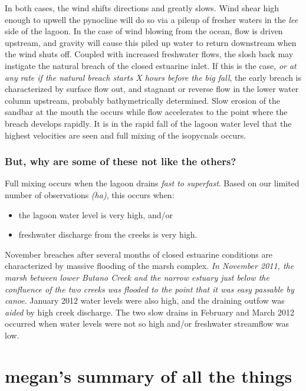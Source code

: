 In both cases, the wind shifts directions and greatly slows. Wind shear high enough to upwell the pynocline will do so via a pileup of fresher waters in the \emph{lee} side of the lagoon. In the case of wind blowing from the ocean, flow is driven upstream, and gravity will cause this piled up water to return downstream when the wind shuts off. Coupled with increased freshwater flows, the slosh back may instigate the natural breach of the closed estuarine inlet. 
If this is the case, \emph{or at any rate if the natural breach starts X hours before the big fall}, the early breach is characterized by surface flow out, and stagnant or reverse flow in the lower water column upstream, probably bathymetrically determined. Slow erosion of the sandbar at the mouth the occurs while flow accelerates to the point where the breach develops rapidly. It is in the rapid fall of the lagoon water level that the highest velocities are seen and full mixing of the isopycnals occurs. 

\subsubsection{But, why are some of these not like the others?}

Full mixing occurs when the lagoon drains \emph{fast to superfast}. Based on our limited number of observations \emph{(ha)}, this occurs when:
\begin{itemize}
	\item the lagoon water level is very high, and/or
	\item freshwater discharge from the creeks is very high.
\end{itemize}
November breaches after several months of closed estuarine conditions are characterized by massive flooding of the marsh complex. \emph{In November 2011, the marsh between lower Butano Creek and the narrow estuary just below the confluence of the two creeks was flooded to the point that it was easy passable by canoe}. January 2012 water levels were also high, and the draining outfow was \emph{aided} by high creek discharge. The two slow drains in February and March 2012 occurred when water levels were not so high and/or freshwater streamflow was low.





\section{megan's summary of all the things} \label{backofch2}

